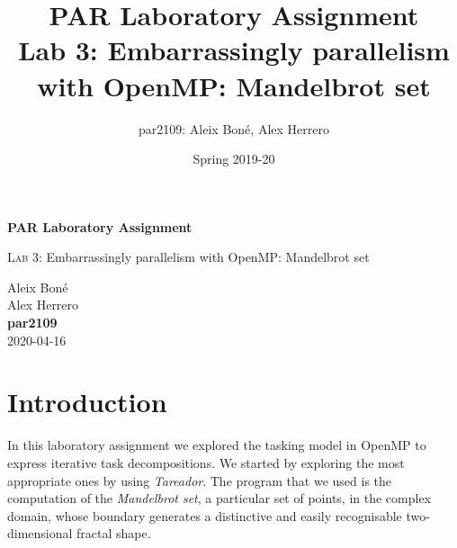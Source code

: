 

\usepackage{caption}
\usepackage{subcaption}
\usepackage{graphicx}
\usepackage{enumitem}
\usepackage{lipsum}

\usepackage{siunitx}
\usepackage{hyphenat}

\usepackage{xcolor}


\usepackage{minted}

\renewcommand\theadfont{\bfseries}

\title{
    PAR Laboratory Assignment\\
    Lab 3: Embarrassingly parallelism with OpenMP: Mandelbrot set
}

\author{
    par2109:
    Aleix Boné,
    Alex Herrero
}

\date{
    Spring 2019-20
}



\thispagestyle{empty}
\clearpage
\setcounter{page}{-1}

\begin{titlepage}
{
    \centering
    \null
    \vfill
    {\Huge \bfseries PAR Laboratory Assignment\par}
    \vspace{3em}
    {\Large {\scshape Lab 3:} Embarrassingly parallelism with OpenMP: Mandelbrot set \par}
    \vfill
\begin{center}
\end{center}
    \vspace{3cm}

    \vfill
    {\raggedleft \Large
        Aleix Boné\\
        Alex Herrero\\
        {\bfseries\ttfamily par2109}\\
        \vspace{4em}
        2020-04-16
        \par}
}
\end{titlepage}


\section{Introduction}%
\label{sec:Introduction}

In this laboratory assignment we explored the tasking model in OpenMP to express iterative task decompositions. 
We started by exploring the most appropriate ones by using \emph{Tareador}. The program that we used is the computation of the \emph{Mandelbrot set}, a particular set of points, in the complex domain, whose boundary generates a distinctive and easily recognisable two-dimensional fractal shape.


